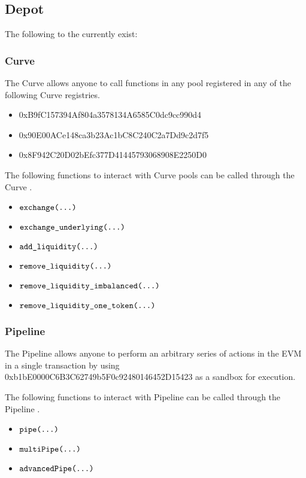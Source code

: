 \documentclass[class=article, crop=false]{standalone}
\begin{document}

\subsection{Depot}

The following  to the  currently exist:

\subsubsection{Curve}

The Curve  allows anyone to call functions in any pool registered in any of the following Curve registries.

\begin{itemize}
    \item 0xB9fC157394Af804a3578134A6585C0dc9cc990d4
    \item 0x90E00ACe148ca3b23Ac1bC8C240C2a7Dd9c2d7f5
    \item 0x8F942C20D02bEfc377D41445793068908E2250D0
\end{itemize}

The following functions to interact with Curve pools can be called through the Curve .

\begin{itemize}
    \item $\texttt{exchange(...)}$
    \item $\texttt{exchange\_underlying(...)}$
    \item $\texttt{add\_liquidity(...)}$
    \item $\texttt{remove\_liquidity(...)}$
    \item $\texttt{remove\_liquidity\_imbalanced(...)}$
    \item $\texttt{remove\_liquidity\_one\_token(...)}$
\end{itemize}

\subsubsection{Pipeline}

The Pipeline  allows anyone to perform an arbitrary series of actions in the EVM in a single transaction by using 0xb1bE0000C6B3C62749b5F0c92480146452D15423 as a sandbox for execution.

The following functions to interact with Pipeline can be called through the Pipeline .
\begin{itemize}
    \item $\texttt{pipe(...)}$
    \item $\texttt{multiPipe(...)}$
    \item $\texttt{advancedPipe(...)}$
\end{itemize}
\end{document}
